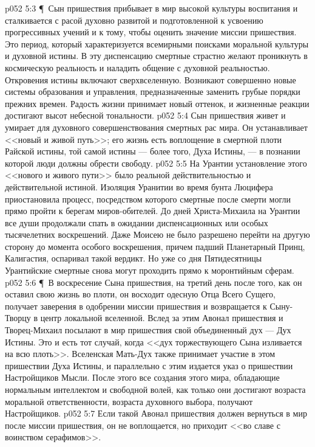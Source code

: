 \vs p052 5:3 \P\ Сын пришествия прибывает в мир высокой культуры воспитания и сталкивается с расой духовно развитой и подготовленной к усвоению прогрессивных учений и к тому, чтобы оценить значение миссии пришествия. Это период, который характеризуется всемирными поисками моральной культуры и духовной истины. В эту диспенсацию смертные страстно желают проникнуть в космическую реальность и наладить общение с духовной реальностью. Откровения истины включают сверхвселенную. Возникают совершенно новые системы образования и управления, предназначенные заменить грубые порядки прежних времен. Радость жизни принимает новый оттенок, и жизненные реакции достигают высот небесной тональности.
\vs p052 5:4 Сын пришествия живет и умирает для духовного совершенствования смертных рас мира. Он устанавливает <<новый и живой путь>>; его жизнь есть воплощение в смертной плоти Райской истины, той самой истины --- более того, Духа Истины, --- в познании которой люди должны обрести свободу.
\vs p052 5:5 На Урантии установление этого <<нового и живого пути>> было реальной действительностью и действительной истиной. Изоляция Уранитии во время бунта Люцифера приостановила процесс, посредством которого смертные после смерти могли прямо пройти к берегам миров\hyp{}обителей. До дней Христа\hyp{}Михаила на Урантии все души продолжали спать в ожидании диспенсационных или особых тысячелетних воскрешений. Даже Моисею не было разрешено перейти на другую сторону до момента особого воскрешения, причем падший Планетарный Принц, Калигастия, оспаривал такой вердикт. Но уже со дня Пятидесятницы Урантийские смертные снова могут проходить прямо к моронтийным сферам.
\vs p052 5:6 \P\ В воскресение Сына пришествия, на третий день после того, как он оставил свою жизнь во плоти, он восходит одесную Отца Всего Сущего, получает заверения в одобрении миссии пришествия и возвращается к Сыну\hyp{}Творцу в центр локальной вселенной. Вслед за этим Авонал пришествия и Творец\hyp{}Михаил посылают в мир пришествия свой объединенный дух --- Дух Истины. Это и есть тот случай, когда <<дух торжествующего Сына изливается на всю плоть>>. Вселенская Мать\hyp{}Дух также принимает участие в этом пришествии Духа Истины, и параллельно с этим издается указ о пришествии Настройщиков Мысли. После этого все создания этого мира, обладающие нормальным интеллектом и свободной волей, как только они достигают возраста моральной ответственности, возраста духовного выбора, получают Настройщиков.
\vs p052 5:7 Если такой Авонал пришествия должен вернуться в мир после миссии пришествия, он не воплощается, но приходит <<во славе с воинством серафимов>>.
